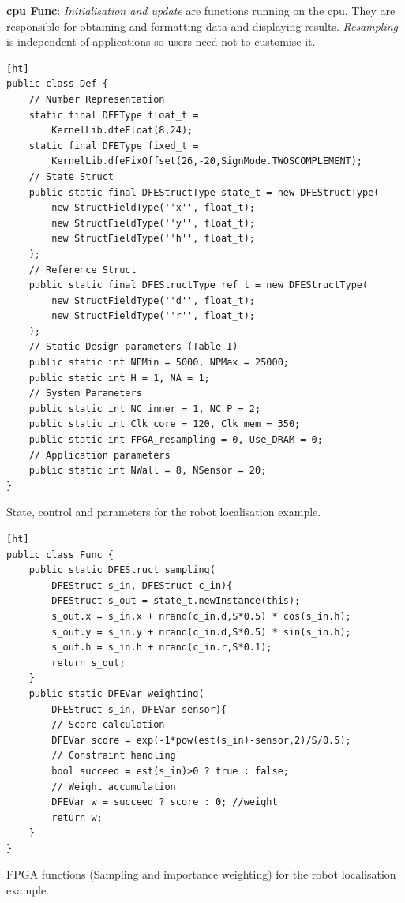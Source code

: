 \textbf{\gls{cpu} Func}: \textit{Initialisation and update} are functions running on the \gls{cpu}.
They are responsible for obtaining and formatting data and displaying results.
\textit{Resampling} is independent of applications so users need not to customise it.

\begin{Code}
    \centering
\lstset{language=Java,
        basicstyle=\ttfamily\small,
				tabsize=2,
				numbers=left,
				numberstyle=\tiny,
				frame=tb,
				columns=fullflexible,
				showstringspaces=false
				}
\begin{lstlisting}[][ht]
public class Def {
	// Number Representation
	static final DFEType float_t = 
		KernelLib.dfeFloat(8,24);
	static final DFEType fixed_t = 
		KernelLib.dfeFixOffset(26,-20,SignMode.TWOSCOMPLEMENT);
	// State Struct
	public static final DFEStructType state_t = new DFEStructType(
		new StructFieldType(''x'', float_t);
		new StructFieldType(''y'', float_t);
		new StructFieldType(''h'', float_t);
	);
	// Reference Struct
	public static final DFEStructType ref_t = new DFEStructType(
		new StructFieldType(''d'', float_t);
		new StructFieldType(''r'', float_t);
	);
	// Static Design parameters (Table I)
	public static int NPMin = 5000, NPMax = 25000;
	public static int H = 1, NA = 1;
	// System Parameters
	public static int NC_inner = 1, NC_P = 2;
	public static int Clk_core = 120, Clk_mem = 350;
	public static int FPGA_resampling = 0, Use_DRAM = 0;
	// Application parameters
	public static int NWall = 8, NSensor = 20;
}
\end{lstlisting}
\caption{State, control and parameters for the robot localisation example.}
\label{lst:def}
\end{Code}

\begin{Code}
\centering
\lstset{language=Java,
        basicstyle=\ttfamily\small,
				tabsize=2,
				numbers=left,
				numberstyle=\tiny,
				frame=tb,
				columns=fullflexible,
				showstringspaces=false
				}
\begin{lstlisting}[][ht]
public class Func {
	public static DFEStruct sampling(
		DFEStruct s_in, DFEStruct c_in){
		DFEStruct s_out = state_t.newInstance(this);
		s_out.x = s_in.x + nrand(c_in.d,S*0.5) * cos(s_in.h);
		s_out.y = s_in.y + nrand(c_in.d,S*0.5) * sin(s_in.h);
		s_out.h = s_in.h + nrand(c_in.r,S*0.1);
		return s_out;
	}
	public static DFEVar weighting(
		DFEStruct s_in, DFEVar sensor){
		// Score calculation
		DFEVar score = exp(-1*pow(est(s_in)-sensor,2)/S/0.5);
		// Constraint handling
		bool succeed = est(s_in)>0 ? true : false;
		// Weight accumulation
		DFEVar w = succeed ? score : 0; //weight
		return w;
	}
}
\end{lstlisting}
\caption{FPGA functions (Sampling and importance weighting) for the robot localisation example.}
\label{lst:func}
\end{Code}


